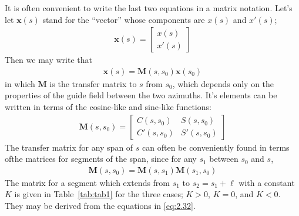 \documentclass[../sands-adaptation.tex]{subfiles}
\begin{document}
It is often convenient to write the last two equations in a matrix notation. Let's let $\boldsymbol{x}(s)$ stand for the “vector” whose components are $x(s)$ and $x'(s)$;
\begin{align}
	\boldsymbol{x}(s) = \begin{bmatrix}
	x(s)\\
	x'(s)
	\end{bmatrix}
\end{align}
Then we may write that
\begin{align}
	\boldsymbol{x}(s)=\boldsymbol{M}(s,s_0)\boldsymbol{x}(s_0)
\end{align}
in which $\boldsymbol{M}$ is the transfer matrix to $s$ from $s_0$, which depends only on the properties of the guide field between the two azimuths. It's elements can be written in terms of the cosine-like and sine-like functions:
\begin{align}
	\boldsymbol{M}(s,s_0) = \begin{bmatrix}
	C(s,s_0) & S(s,s_0)\\
	C'(s,s_0) & S'(s,s_0)
	\end{bmatrix}\label{eq:2.37}
\end{align}
The transfer matrix for any span of $s$ can often be conveniently found in terms ofthe matrices for segments of the span, since for any $s_1$ between $s_0$ and $s$,
\begin{align}
	\boldsymbol{M}(s,s_0) = \boldsymbol{M}(s,s_1)\boldsymbol{M}(s_1,s_0)
\end{align}
The matrix for a segment which extends from $s_1$ to $s_2 = s_1 + \ell$ with a constant $K$ is given in Table~\ref{tab:tab1} for the three cases; $K > 0$, $K = 0$, and $K < 0$. They may be derived from the equations in \eqref{eq:2.32}.
\end{document}
